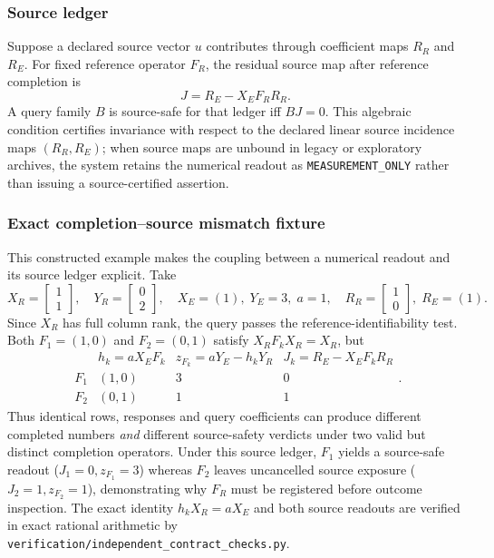 \documentclass[11pt]{article}
\begin{document}
\subsubsection{Source ledger}
Suppose a declared source vector $u$ contributes through coefficient maps $R_R$ and $R_E$. For fixed reference operator $F_R$, the residual source map after reference completion is
\[
J=R_E-X_EF_RR_R.
\]
A query family $B$ is source-safe for that ledger iff $BJ=0$. This algebraic condition certifies invariance with respect to the declared linear source incidence maps $(R_R, R_E)$; when source maps are unbound in legacy or exploratory archives, the system retains the numerical readout as \texttt{MEASUREMENT\_ONLY} rather than issuing a source-certified assertion.

\subsubsection{Exact completion--source mismatch fixture}
\label{supp:completion-source-fixture}
This constructed example makes the coupling between a numerical readout and its source ledger explicit. Take
\[
X_R=\begin{bmatrix}1\\1\end{bmatrix},\quad
Y_R=\begin{bmatrix}0\\2\end{bmatrix},\quad
X_E=(1),\;Y_E=3,\;a=1,\quad
R_R=\begin{bmatrix}1\\0\end{bmatrix},\;R_E=(1).
\]
Since $X_R$ has full column rank, the query passes the reference-identifiability test. Both $F_1=(1,0)$ and $F_2=(0,1)$ satisfy $X_RF_kX_R=X_R$, but
\[
\begin{array}{c|ccc}
 & h_k=aX_EF_k & z_{F_k}=aY_E-h_kY_R & J_k=R_E-X_EF_kR_R\\\hline
F_1&(1,0)&3&0\\
F_2&(0,1)&1&1
\end{array}.
\]
Thus identical rows, responses and query coefficients can produce different completed numbers \emph{and} different source-safety verdicts under two valid but distinct completion operators. Under this source ledger, $F_1$ yields a source-safe readout ($J_1=0, z_{F_1}=3$) whereas $F_2$ leaves uncancelled source exposure ($J_2=1, z_{F_2}=1$), demonstrating why $F_R$ must be registered before outcome inspection. The exact identity $h_kX_R=aX_E$ and both source readouts are verified in exact rational arithmetic by \nolinkurl{verification/independent_contract_checks.py}.
\end{document}
